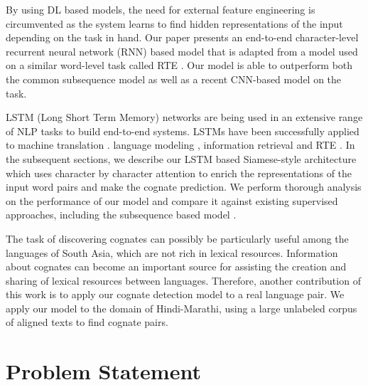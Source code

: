 \documentclass[11pt,letterpaper]{article}
\begin{document}

By using DL based models, the need for external feature engineering is circumvented as the system learns to find hidden representations of the input depending on the task in hand. Our paper presents an end-to-end character-level recurrent neural network (RNN) based model that is adapted from a model used on a similar word-level task called RTE \cite{rocktaschel2016reasoning}. Our model is able to outperform both the common subsequence model \cite{rama2015automatic} as well as a recent CNN-based model \cite{rama2016siamese} on the task. 

LSTM (Long Short Term Memory) networks are being used in an extensive range of NLP tasks to build end-to-end systems. LSTMs have been successfully applied to machine translation \cite{bahdanau2014neural}. language modeling \cite{mikolov2010recurrent}, information retrieval \cite{sordoni2015hierarchical} and RTE \cite{snli:emnlp2015}. In the subsequent sections, we describe our LSTM based Siamese-style architecture which uses character by character attention to enrich the representations of the input word pairs and make the cognate prediction. We perform thorough analysis on the performance of our model and compare it against existing supervised approaches, including the subsequence based model \cite{rama2015automatic}.


The task of discovering cognates can possibly be particularly useful among the languages of South Asia, which are not rich in lexical resources. Information about cognates can become an important source for assisting the creation and sharing of lexical resources between languages. Therefore, another contribution of this work is to apply our cognate detection model to a real language pair. We apply our model to the domain of Hindi-Marathi, using a large unlabeled corpus of aligned texts to find cognate pairs.

\section{Problem Statement}
\end{document}
